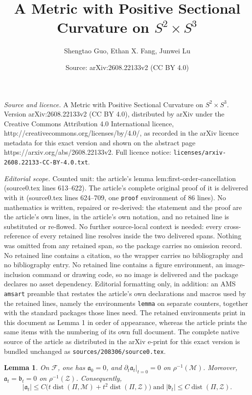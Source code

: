 \documentclass[10pt,a4paper]{amsart}
\title{\LARGE A Metric with Positive Sectional Curvature on $S^2\times S^3$}
\author{Shengtao Guo, Ethan X. Fang, Junwei Lu}
\date{Source: arXiv:2608.22133v2 (CC BY 4.0)}
\newtheorem{lemma}{Lemma}
\newcommand{\cM}{\mathcal M}
\newcommand{\cZ}{\mathcal Z}
\newcommand{\dist}{\operatorname{dist}}
\begin{document}
\maketitle

\noindent\emph{Source and licence.} \LARGE A Metric with Positive Sectional Curvature on $S^2\times S^3$. Version arXiv:2608.22133v2 (CC BY 4.0), distributed by arXiv under the Creative Commons Attribution 4.0 International licence, http://creativecommons.org/licenses/by/4.0/, as recorded in the arXiv licence metadata for this exact version and shown on the abstract page https://arxiv.org/abs/2608.22133v2. Full licence notice: \texttt{licenses/arxiv-2608.22133-CC-BY-4.0.txt}.\par\smallskip

\noindent\textit{Editorial scope.} Counted unit: the article's lemma lem:first-order-cancellation (source0.tex lines 613--622). The article's complete original proof of it is delivered with it (source0.tex lines 624--709, one \texttt{proof} environment of 86 lines). No mathematics is written, repaired or re-derived: the statement and the proof are the article's own lines, in the article's own notation, and no retained line is substituted or re-flowed.  No further source-local context is needed: every cross-reference of every retained line resolves inside the two delivered spans.  Nothing was omitted from any retained span, so the package carries no omission record.  No retained line contains a citation, so the wrapper carries no bibliography and no bibliography entry.  No retained line contains a figure environment, an image-inclusion command or drawing code, so no image is delivered and the package declares no asset dependency.  Editorial formatting only, in addition: an AMS \texttt{amsart} preamble that restates the article's own declarations and macros used by the retained lines, namely the environments \texttt{lemma} on separate counters, together with the standard packages those lines need.  The retained environments print in this document as Lemma 1 in order of appearance, whereas the article prints the same items with the numbering of its own full document.  The complete native source of the article as distributed in the arXiv e-print for this exact version is bundled unchanged as \texttt{sources/208306/source0.tex}.
\begin{lemma}                                                                       \label{lem:first-order-cancellation}
On $\mathscr F$, one has $\mathfrak a_0=0$, and
$\left.\partial_t\mathfrak a_t\right|_{t=0}=0$ on
$\rho^{-1}(\cM)$.  Moreover, $\mathfrak a_t=\mathfrak b_t=0$ on
$\rho^{-1}(\cZ)$.  Consequently,
\begin{equation}                                                                    \label{eq:a-b-distance-estimates}
 |\mathfrak a_t|\leq C\bigl(t\dist(\Pi,\cM)+t^2\dist(\Pi,\cZ)\bigr)
 \;\text{and}\; |\mathfrak b_t|\leq C\dist(\Pi,\cZ).
\end{equation}
\end{lemma}
\end{document}
